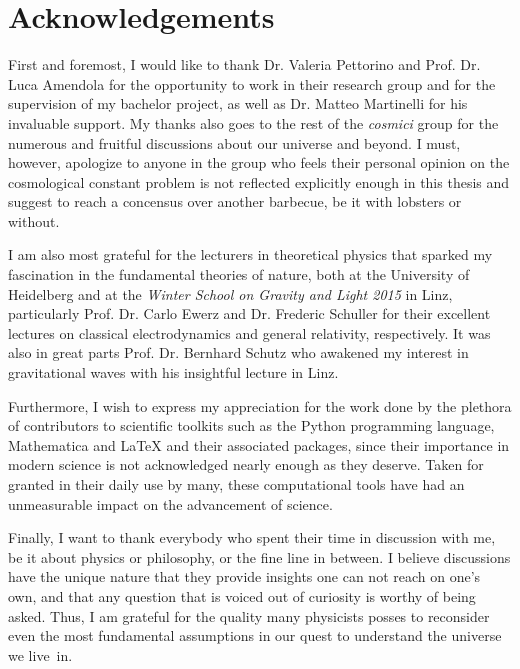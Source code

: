 \chapter{Acknowledgements}

First and foremost, I would like to thank Dr. Valeria Pettorino and Prof. Dr. Luca Amendola for the opportunity to work in their research group and for the supervision of my bachelor project, as well as Dr. Matteo Martinelli for his invaluable support. My thanks also goes to the rest of the \emph{cosmici} group for the numerous and fruitful discussions about our universe and beyond. I must, however, apologize to anyone in the group who feels their personal opinion on the cosmological constant problem is not reflected explicitly enough in this thesis and suggest to reach a concensus over another barbecue, be it with lobsters or without.

I am also most grateful for the lecturers in theoretical physics that sparked my fascination in the fundamental theories of nature, both at the University of Heidelberg and at the \emph{Winter School on Gravity and Light 2015} in Linz, particularly Prof. Dr. Carlo Ewerz and Dr. Frederic Schuller for their excellent lectures on classical electrodynamics and general relativity, respectively. It was also in great parts Prof. Dr. Bernhard Schutz who awakened my interest in gravitational waves with his insightful lecture in Linz.

Furthermore, I wish to express my appreciation for the work done by the plethora of contributors to scientific toolkits such as the Python programming language, Mathematica and \LaTeX{} and their associated packages, since their importance in modern science is not acknowledged nearly enough as they deserve. Taken for granted in their daily use by many, these computational tools have had an unmeasurable impact on the advancement of science.

Finally, I want to thank everybody who spent their time in discussion with me, be it about physics or philosophy, or the fine line in between. I believe discussions have the unique nature that they provide insights one can not reach on one's own, and that any question that is voiced out of curiosity is worthy of being asked. Thus, I am grateful for the quality many physicists posses to reconsider even the most fundamental assumptions in our quest to understand the universe we live~in.

